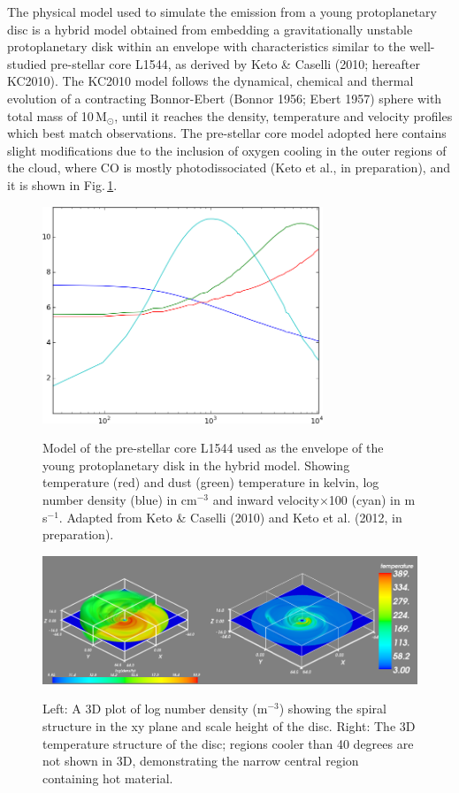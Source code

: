 \documentclass[useAMS,usenatbib]{mn2e}
\begin{document}
The physical model used to simulate the emission from a young protoplanetary disc is a hybrid model obtained from embedding a gravitationally unstable protoplanetary disk  within an envelope with characteristics similar to the well-studied pre-stellar core L1544, as derived by Keto \& Caselli (2010; hereafter KC2010). The KC2010 model follows the dynamical, chemical and thermal evolution of a contracting Bonnor-Ebert (Bonnor 1956; Ebert 1957) sphere with total mass of 10\,M$_{\odot}$, until it reaches the density, temperature and velocity profiles which best match observations. The pre-stellar core model adopted here contains slight modifications due to the inclusion of oxygen cooling in the outer regions of the cloud, where CO is mostly photodissociated (Keto et al., in preparation), and it is shown in Fig.\,\ref{fig:l1544_model}.  \newline


\begin{figure}
 \includegraphics[width=84mm]{Figures/model/L1544model_used.png}
 \label{fig:l1544_model}
 \caption{Model of the pre-stellar core L1544 used as the envelope of the young protoplanetary disk in the hybrid model. Showing temperature (red) and dust (green) temperature in kelvin, log number density (blue) in cm$^{-3}$ and inward velocity$\times$100 (cyan) in m$\,$s$^{-1}$. Adapted from Keto \& Caselli (2010) and Keto et al. (2012, in preparation).}
\end{figure}

\begin{figure}
 \includegraphics[width=168mm]{Figures/model/rhoT2.png}
 \label{rhoT} 
 \caption{Left: A 3D plot of log number density (m$^{-3}$) showing the spiral structure in the xy plane and scale height of the disc. Right: The 3D temperature structure of the disc; regions cooler than 40 degrees are not shown in 3D, demonstrating the narrow central region containing hot material.}
\end{figure}
\end{document}
